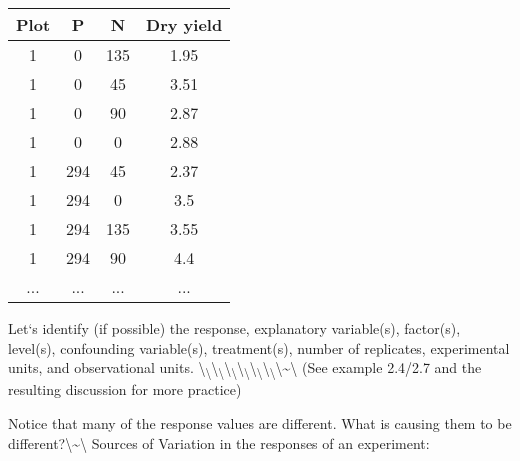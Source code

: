 \documentclass[]{book}
\begin{document}
\begin{center}
\begin{tabular}{c|c|c|c}
\hline
Plot    &P  &N& Dry yield\\
\hline
1&  0&  135&    1.95\\
1&  0&  45& 3.51\\
1&  0&  90& 2.87\\
1&  0&  0&  2.88\\
1&  294 &45&    2.37\\
1&  294 &0& 3.5\\
1&  294 &135&   3.55\\
1&  294&    90& 4.4\\
...&...&...&...\\
\end{tabular}
\end{center}

Let`s identify (if possible) the response, explanatory variable(s),
factor(s), level(s), confounding variable(s), treatment(s), number of
replicates, experimental units, and observational units.
\textbackslash{}\textsubscript{\textbackslash{}}\textbackslash{}\textsubscript{\textbackslash{}}\textbackslash{}\textsubscript{\textbackslash{}}\textbackslash{}\textsubscript{\textbackslash{}}\textbackslash{}\textsubscript{\textbackslash{}}\textbackslash{}\textsubscript{\textbackslash{}}\textbackslash{}\textasciitilde{}\textbackslash{}
(See example 2.4/2.7 and the resulting discussion for more practice)

\newpage

Notice that many of the response values are different. What is causing
them to be different?\textbackslash{}\textasciitilde{}\textbackslash{}
Sources of Variation in the responses of an experiment:
\end{document}
